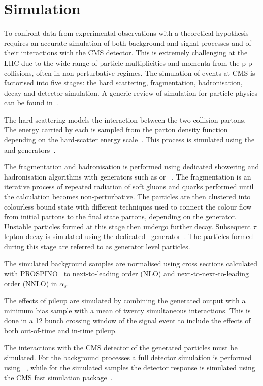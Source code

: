 \section{Simulation}

To confront data from experimental observations with a theoretical hypothesis requires an accurate
simulation of both background and signal processes and of their interactions with the CMS detector.
This is extremely challenging at the LHC due to the wide range of particle multiplicities and momenta 
from the p-p collisions, often in non-perturbative regimes. The simulation of events at CMS 
is factorised into five stages: the hard scattering, fragmentation, hadronisation, decay and 
detector simulation. A generic review of simulation for particle physics can be found in~\cite{sim_rev}.

The hard scattering models the interaction between the two collision partons. The energy carried by each
is sampled from the parton density function depending on the hard-scatter energy scale~\cite{pdf}. 
This process is simulated using the \PYTHIA and \MADGRAPH generators~\cite{PYTHIA,MADGRAPH}. 

The fragmentation and hadronisation is performed using dedicated showering and hadronisation algorithms with
generators such as \PYTHIA or \HERWIG~\cite{PYTHIA,HERWIG}. The fragmentation is an iterative process of repeated 
radiation of soft gluons and quarks performed until the calculation becomes non-perturbative. 
The particles are then clustered into colourless bound state with different techniques used
to connect the colour flow from initial partons to the final state partons, depending on the generator. 
Unstable particles formed at this stage then undergo further decay. Subsequent $\tau$ lepton 
decay is simulated using the dedicated \TAUOLA~generator~\cite{TAUOLA}. The particles formed 
during this stage are referred to as generator level particles. 

The simulated background samples are normalised using cross sections calculated with PROSPINO~\cite{Prospino}
to next-to-leading order (NLO) and next-to-next-to-leading order (NNLO) in $\alpha_s$.

The effects of pileup are simulated by combining the generated output with a minimum bias sample 
with a mean of twenty simultaneous interactions. This is done in a 12 bunch 
crossing window of the signal event to include the effects of both 
out-of-time and in-time pileup.

The interactions with the CMS detector of the generated particles must be simulated. For the background processes
a full detector simulation is performed using \GEANTfour~\cite{GEANT}, while for the simulated
samples the detector response is simulated using the CMS fast simulation package~\cite{fastsim}.

